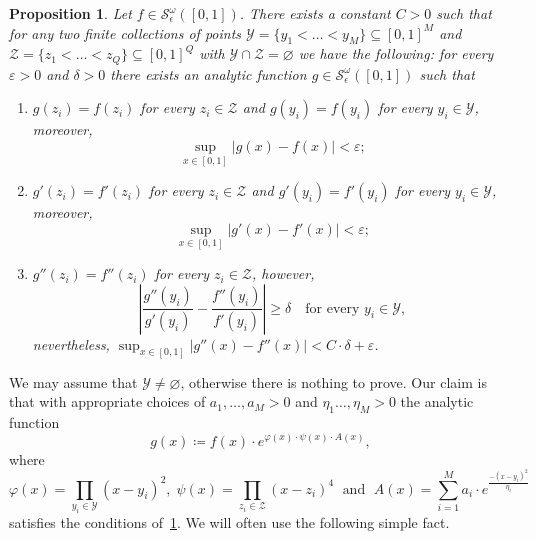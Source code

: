\documentclass[11pt,]{article}
\def\cref#1{\ref{#1}}%
\newtheorem{proposition}[theorem]{Proposition}
\theoremstyle{definition}
\theoremstyle{remark}
\newcommand{\0}{\mathbf{0}}
\numberwithin{equation}{section}
\begin{document}
\begin{proposition}\label{prop:AnalyticBumpFunc}
Let $f\in \mathcal{S}^{\omega}_\epsilon([0,1])$. There exists a constant $C>0$ such that for
any two finite collections of points
$\mathcal{Y}=\{y_1<\ldots<y_M\}\subseteq[0,1]^M$ and $\mathcal{Z}=\{z_1<\ldots<
z_Q\}\subseteq[0,1]^Q$ with $\mathcal{Y}\cap\mathcal{Z}=\varnothing$ we have the following: for
every $\varepsilon>0$ and $\delta>0$ there exists an analytic function
$g\in\mathcal{S}^{\omega}_\epsilon([0,1])$ such that
\begin{enumerate}[label=(\roman*)]
\item $g(z_i)=f(z_i)$ for every $z_i\in\mathcal{Z}$ and $g(y_i)=f(y_i)$ for every $y_i\in\mathcal{Y}$, moreover,
\begin{equation*}
\sup_{x\in[0,1]}|g(x)-f(x)|<\varepsilon;
\end{equation*}
\item  $g'(z_i)=f'(z_i)$ for every $z_i\in\mathcal{Z}$ and $g'(y_i)=f'(y_i)$ for every $y_i\in\mathcal{Y}$, moreover,
\begin{equation*}
	\sup_{x\in[0,1]}|g'(x)-f'(x)|<\varepsilon;
\end{equation*}
\item $g''(z_i)=f''(z_i)$ for every $z_i\in\mathcal{Z}$, however,
\begin{equation*}
	\left| \frac{g''(y_i)}{g'(y_i)} - \frac{f''(y_i)}{f'(y_i)} \right|\geq \delta \quad\text{
	for every } y_i\in\mathcal{Y},
\end{equation*}
nevertheless, $	\sup_{x\in[0,1]}|g''(x)-f''(x)|<C\cdot \delta +\varepsilon$.
\end{enumerate}
\end{proposition}

We may assume that $\mathcal{Y}\neq\varnothing$, otherwise there is nothing to prove. Our claim is
that with appropriate choices of $a_1,\ldots,a_M>0$ and $\eta_1\ldots,\eta_M>0$ the analytic
function
\begin{equation}\label{eq:BumpFunc}
g(x)\coloneqq f(x)\cdot e^{\varphi(x)\cdot \psi(x)\cdot A(x)},
\end{equation} 
where
\begin{equation*}
\varphi(x)=\prod_{y_i\in\mathcal{Y}} (x-y_i)^2,\; \psi(x) = \prod_{z_i\in\mathcal{Z}} (x-z_i)^4
\;\text{ and }\; A(x)= \sum_{i=1}^{M} a_i\cdot e^{\frac{-(x-y_i)^2}{\eta_i}}
\end{equation*}
satisfies the conditions of~\cref{prop:AnalyticBumpFunc}. We will often use the following simple fact.
\end{document}
